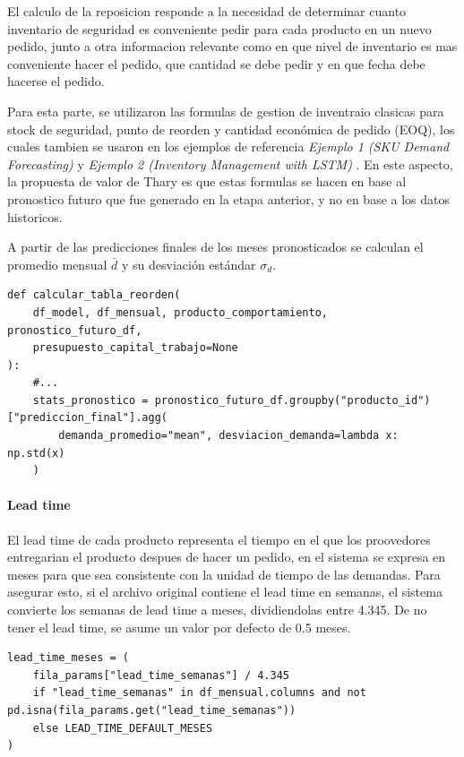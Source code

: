 El calculo de la reposicion responde a la necesidad de determinar cuanto inventario de seguridad es conveniente pedir para cada producto en un nuevo pedido, junto a otra informacion relevante como en que nivel de inventario es mas conveniente hacer el pedido, que cantidad se debe pedir y en que fecha debe hacerse el pedido.

Para esta parte, se utilizaron las formulas de gestion de inventraio clasicas para stock de seguridad, punto de reorden y cantidad económica de pedido (EOQ), los cuales tambien se usaron en los ejemplos de referencia \textit{Ejemplo 1 (SKU Demand Forecasting)} \cite{ejemplo1_demandforecast} y \textit{Ejemplo 2 (Inventory Management with LSTM)} \cite{ejemplo2_lstm_inventory}. En este aspecto, la propuesta de valor de Thary es que estas formulas se hacen en base al pronostico futuro que fue generado en la etapa anterior, y no en base a los datos historicos. 

A partir de las predicciones finales de los meses pronosticados se calculan el promedio mensual $\bar{d}$ y su desviación estándar $\sigma_d$.    

\begin{verbatim}
def calcular_tabla_reorden(
    df_model, df_mensual, producto_comportamiento, pronostico_futuro_df,
    presupuesto_capital_trabajo=None
):
    #...
    stats_pronostico = pronostico_futuro_df.groupby("producto_id")["prediccion_final"].agg(
        demanda_promedio="mean", desviacion_demanda=lambda x: np.std(x)
    )
\end{verbatim}

\paragraph{Lead time}

El lead time de cada producto representa el tiempo en el que los proovedores entregarian el producto despues de hacer un pedido, en el sistema se expresa en meses para que sea consistente con la unidad de tiempo de las demandas. Para asegurar esto, si el archivo original contiene el lead time en semanas, el sistema convierte los semanas de lead time a meses, dividiendolas entre 4.345. De no tener el lead time, se asume un valor por defecto de 0.5 meses.

\begin{verbatim}
lead_time_meses = (
    fila_params["lead_time_semanas"] / 4.345
    if "lead_time_semanas" in df_mensual.columns and not pd.isna(fila_params.get("lead_time_semanas"))
    else LEAD_TIME_DEFAULT_MESES
)
\end{verbatim}

